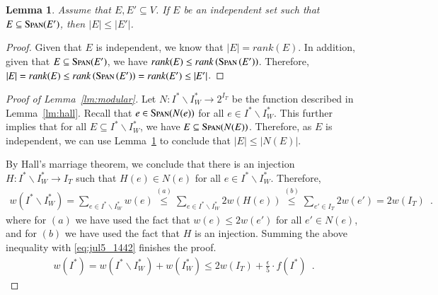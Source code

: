 \documentclass[11pt]{article}
\newtheorem{lemma}[theorem]{Lemma}
\newcommand{\spn}{{\textsc{Span}}}
\begin{document}
\begin{lemma}
    \label{lm:matroid:hall_property_in_matroid}
    Assume that $E, E' \subseteq V$. If $E$ be an independent set such that $E \subseteq \spn(E')$, then $|E| \le |E'|$. 
\end{lemma}
\begin{proof}
    Given that $E$ is independent, we know that $|E| = rank(E)$.
    In addition, given that $E \subseteq \spn(E')$, we have $rank(E) \le rank\left(\spn\left(E'\right)\right)$.
    Therefore, $        |E| = rank(E) \le rank\left(\spn\left(E'\right)\right) = rank(E') \le |E'|$. 
\end{proof}

\begin{proof}[Proof of Lemma~\ref{lm:modular}]
    Let $N: I^* \backslash I^*_{W} \to 2^{I_{T}}$ be the function described in Lemma~\ref{lm:hall}.
    Recall that $e \in \spn(N(e))$ for all $e \in I^* \backslash I^*_{W}$.
    This further implies that for all
    $E \subseteq I^* \backslash I^*_{W}$, 
    we have $E \subseteq \spn(N(E))$.
    Therefore, as $E$ is independent, we can use Lemma~\ref{lm:matroid:hall_property_in_matroid} to conclude that $|E| \le |N(E)|$.
    
    By Hall's marriage theorem, we conclude that there is an injection $H: I^* \backslash I^*_{W} \to I_T$ such that
    $H(e) \in N(e)$ for all $e\in I^* \backslash I^*_{W}$. Therefore, 
    \begin{align*}
        w(I^* \backslash I^*_{W})
        =
        \sum_{e \in I^* \backslash I^*_{W}}
        w(e)
        \overset{(a)}{\le}
        \sum_{e \in I^* \backslash I^*_{W}}
        2w(H(e))
        \overset{(b)}{\le} \sum_{e' \in I_T}2w(e')
        = 2w(I_T) \enspace .
    \end{align*}
    where for $(a)$ we have used the fact that
    $w(e) \le 2w(e')$ for all $e' \in N(e)$, and for $(b)$ we have used the fact that $H$ is an injection. Summing the above inequality with \eqref{eq:jul5_1442} finishes the proof.
    \begin{align*}
        w(I^*) = w(I^* \backslash I^*_{W}) + w(I^*_W) \le 2w(I_T) + \frac{\epsilon}{5} \cdot f(I^*) \enspace .
    \end{align*}
\end{proof}
  
  
\end{document}
